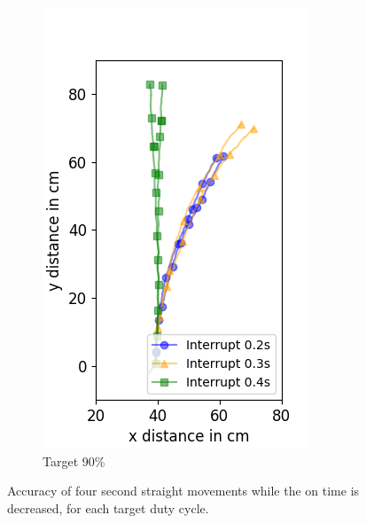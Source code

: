 \begin{figure}
\begin{subfigure}[b]{0.32\textwidth}
		\includegraphics[width=\textwidth]{pics/figure_90.png}
		\caption{Target 90\%}
		\label{fig:target_90}
	\end{subfigure}
	\caption{Accuracy of four second straight movements while the on time is decreased, for each target duty cycle.}
	\label{fig:decreasing_power_period}
\end{figure}

